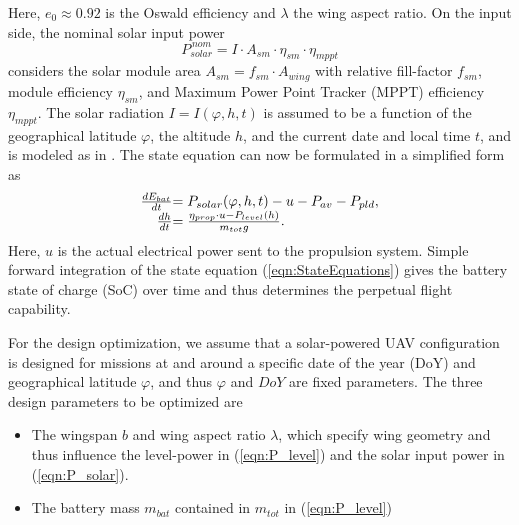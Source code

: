 Here, $e_0\approx0.92$ is the Oswald efficiency and $\lambda$ the wing aspect ratio. On the input side, the nominal solar input power
\begin{equation} \label{eqn:P_solar}
P_{solar}^{\,nom}=I\cdot A_{sm}\cdot\eta_{sm}\cdot\eta_{mppt}
\end{equation}
considers the solar module area $A_{sm}=f_{sm}\cdot A_{wing}$ with relative fill-factor $f_{sm}$, module efficiency $\eta_{sm}$, and Maximum Power Point Tracker (MPPT) efficiency $\eta_{mppt}$. The solar radiation $I=I(\varphi,h,t)$ is assumed to be a function of the geographical latitude $\varphi$, the altitude $h$, and the current date and local time $t$, and is modeled as in \cite{Duffie_SolarEngineering}.
The state equation can now be formulated in a simplified form as
\begin{equation}\label{eqn:StateEquations}
\begin{array}{r@{}l}
\frac{dE_{bat}}{dt}&=P_{solar}(\varphi,h,t)-u-P_{av}-P_{pld},\\
\frac{dh}{dt}&=\frac{\eta_{prop}\cdot u-P_{level}(h)}{m_{tot}g} .
\end{array}
\end{equation}
Here, $u$ is the actual electrical power sent to the propulsion system. Simple forward integration of the state equation (\ref{eqn:StateEquations}) gives the battery state of charge (SoC) over time and thus determines the perpetual flight capability.

For the design optimization, we assume that a solar-powered UAV configuration is designed for missions at and around a specific date of the year (DoY) and geographical latitude $\varphi$, and thus $\varphi$ and $DoY$ are fixed parameters. The three design parameters to be optimized are
\begin{itemize}
\item The wingspan $b$ and wing aspect ratio $\lambda$, which specify wing geometry and thus influence the level-power in (\ref{eqn:P_level}) and the solar input power in (\ref{eqn:P_solar}).
\item The battery mass $m_{bat}$ contained in $m_{tot}$ in (\ref{eqn:P_level}) 
\end{itemize}
